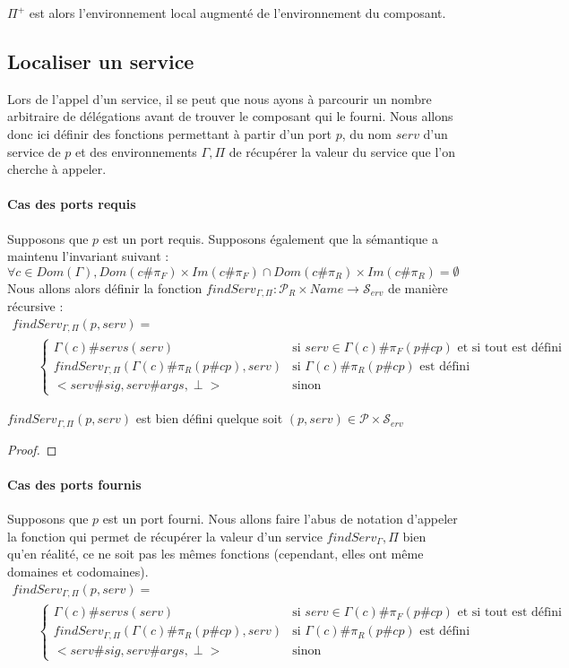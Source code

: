 \documentclass[11pt,a4paper,fleqn]{report}
\newcommand{\Po}{\mathcal{P}}
\newcommand{\PR}{\mathcal{P}_R}
\newcommand{\Serv}{\mathcal{S}_{erv}}
\newcommand{\Envs}{\Gamma,\Pi}
\begin{document}
$\Pi^+$ est alors l'environnement local augmenté de l'environnement du composant.

\subsection{Localiser un service}
Lors de l'appel d'un service, il se peut que nous ayons à parcourir un nombre arbitraire de délégations avant de trouver le composant qui le fourni. Nous allons donc ici définir des fonctions permettant à partir d'un port $p$, du nom $serv$ d'un service de $p$  et des environnements $\Envs$ de récupérer la valeur du service que l'on cherche à appeler.

\paragraph{Cas des ports requis}
Supposons que $p$ est un port requis. Supposons également que la sémantique a maintenu l'invariant suivant : \[\forall c \in Dom(\Gamma), Dom(c\#\pi_F) \times Im(c\#\pi_F) \cap Dom(c\#\pi_R) \times Im(c\#\pi_R) = \emptyset\] Nous allons alors définir la fonction $findServ_{\Envs} : \PR \times Name \rightarrow \Serv$ de manière récursive : 
\begin{multline*}findServ_{\Envs}(p,serv) =\\
\qquad \begin{cases}
\Gamma(c)\#servs(serv) &\text{si $serv\in \Gamma(c)\#\pi_F(p\#cp)$ et si tout est défini}\\
findServ_{\Envs}(\Gamma(c)\#\pi_R(p\#cp),serv) &\text{si $\Gamma(c)\#\pi_R(p\#cp)$ est défini}\\
<serv\#sig,serv\#args,\perp> & \text{sinon}
\end{cases}
\end{multline*}

\begin{prop}$findServ_{\Envs}(p,serv)$ est bien défini quelque soit $(p,serv) \in \Po\times\Serv$
\end{prop}
\begin{proof}

\end{proof}

\paragraph{Cas des ports fournis}
Supposons que $p$ est un port fourni. Nous allons faire l'abus de notation d'appeler la fonction qui permet de récupérer la valeur d'un service $findServ_\Envs$ bien qu'en réalité, ce ne soit pas les mêmes fonctions (cependant, elles ont même domaines et codomaines).
\begin{multline*}findServ_{\Envs}(p,serv) =\\
\qquad \begin{cases}
\Gamma(c)\#servs(serv) &\text{si $serv\in \Gamma(c)\#\pi_F(p\#cp)$ et si tout est défini}\\
findServ_{\Envs}(\Gamma(c)\#\pi_R(p\#cp),serv) &\text{si $\Gamma(c)\#\pi_R(p\#cp)$ est défini}\\
<serv\#sig,serv\#args,\perp> & \text{sinon}
\end{cases}
\end{multline*}
\end{document}
